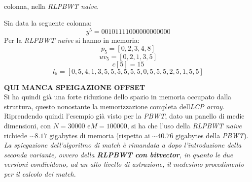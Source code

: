 colonna, nella \textit{RLPBWT naive}.
\begin{esempio}
  Sia data la seguente colonna:
  \[y^5=00101111000000000000\]
  Per la \textit{RLPBWT naive} si hanno in memoria:
  \[p_5=[0,2,3,4,8]\]
  \[uv_5=[0,2,1,3,5]\]
  \[c[5]=15\]
  \[l_5=[0,5,4,1,3,5,5,5,5,5,5,0,5,5,5,2,5,1,5,5]\]
\end{esempio}
\textbf{QUI MANCA SPEIGAZIONE OFFSET}\\
Si ha quindi già una forte riduzione dello spazio in memoria occupato dalla
struttura, questo nonostante la memorizzazione completa dell\textit{LCP array}.
Riprendendo quindi l'esempio già visto per la \textit{PBWT}, dato un panello di
medie dimensioni, con $N = 30000$ e$ M = 100000$, si ha che l'uso della
\textit{RLPBWT naive} richiede $\sim 8.17$ gigabytes di memoria (rispetto ai
$\sim 40.76$ gigabytes della \textit{PBWT}).\\
\textit{La spiegazione dell'algoritmo di match è rimandata a dopo l'introduzione
  della seconda variante, ovvero della \textbf{RLPBWT con bitvector}, in quanto
  le due versioni condividono, ad un alto livello di astrazione, il medesimo
  procedimento per il calcolo dei match.}
